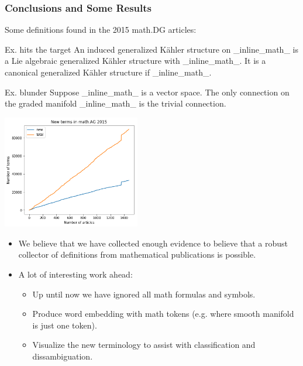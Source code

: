 \documentclass[10pt]{beamer}
\begin{document}
\begin{frame} 
    \frametitle{Conclusions and Some Results}
    Some definitions found in the 2015 math.DG articles:
    \begin{block}{Ex. hits the target}
        {\small An {\color{blue}induced generalized Kähler structure} on \_inline\_math\_ is a Lie algebraic generalized Kähler structure with \_inline\_math\_. It is a canonical generalized Kähler structure if \_inline\_math\_.}
    \end{block}
    \begin{exampleblock}{Ex. blunder}
        {\small Suppose \_inline\_math\_ is a {\color{green}vector space}. The only connection on the {\color{green}graded manifold} \_inline\_math\_ is the {\color{blue}trivial connection}.}
    \end{exampleblock}
        \begin{center}
    \includegraphics[width=0.45\textwidth]{cum_terms.png} 
        \end{center}
\end{frame}
\begin{frame} 
    \begin{itemize}
            \item We believe that we have collected enough evidence to believe that a robust collector of definitions from mathematical publications is possible.
            \item A lot of interesting work ahead:
                \begin{itemize}
                    \item Up until now we have ignored all math formulas and symbols.
                    \item Produce word embedding with math tokens (e.g. where smooth manifold is just one token).
                        \item Visualize the new terminology to assist with classification and dissambiguation.
                \end{itemize}
    \end{itemize}
\end{frame}

\begin{frame}
\titlepage
\end{frame}
\end{document}
